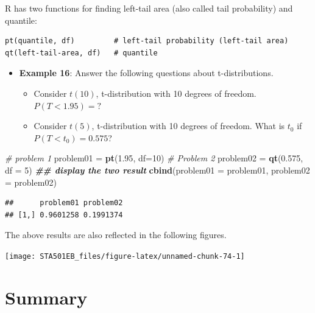 \documentclass[
]{book}
\newenvironment{Shaded}{\begin{snugshade}}{\end{snugshade}}
\newcommand{\AttributeTok}[1]{\textcolor[rgb]{0.13,0.29,0.53}{#1}}
\newcommand{\CommentTok}[1]{\textcolor[rgb]{0.56,0.35,0.01}{\textit{#1}}}
\newcommand{\DecValTok}[1]{\textcolor[rgb]{0.00,0.00,0.81}{#1}}
\newcommand{\DocumentationTok}[1]{\textcolor[rgb]{0.56,0.35,0.01}{\textbf{\textit{#1}}}}
\newcommand{\FloatTok}[1]{\textcolor[rgb]{0.00,0.00,0.81}{#1}}
\newcommand{\FunctionTok}[1]{\textcolor[rgb]{0.13,0.29,0.53}{\textbf{#1}}}
\newcommand{\NormalTok}[1]{#1}
\newcommand{\OtherTok}[1]{\textcolor[rgb]{0.56,0.35,0.01}{#1}}
\providecommand{\tightlist}{%
  \setlength{\itemsep}{0pt}\setlength{\parskip}{0pt}}
\begin{document}
R has two functions for finding left-tail area (also called tail probability) and quantile:

\begin{verbatim}
pt(quantile, df)         # left-tail probability (left-tail area)
qt(left-tail-area, df)   # quantile
\end{verbatim}

\begin{itemize}
\tightlist
\item
  \textbf{Example 16}: Answer the following questions about t-distributions.

  \begin{itemize}
  \tightlist
  \item
    Consider \(t(10)\), t-distribution with 10 degrees of freedom. \(P(T<1.95) = ?\)
  \item
    Consider \(t(5)\), t-distribution with 10 degrees of freedom. What is \(t_0\) if \(P(T<t_0) = 0.575\)?
  \end{itemize}
\end{itemize}

\begin{Shaded}
\begin{Highlighting}[]
\CommentTok{\# problem 1}
\NormalTok{problem01 }\OtherTok{=} \FunctionTok{pt}\NormalTok{(}\FloatTok{1.95}\NormalTok{, }\AttributeTok{df=}\DecValTok{10}\NormalTok{)}
\CommentTok{\# Problem 2}
\NormalTok{problem02 }\OtherTok{=} \FunctionTok{qt}\NormalTok{(}\FloatTok{0.575}\NormalTok{, }\AttributeTok{df =} \DecValTok{5}\NormalTok{)}
\DocumentationTok{\#\# display the two result}
\FunctionTok{cbind}\NormalTok{(}\AttributeTok{problem01 =}\NormalTok{ problem01, }\AttributeTok{problem02 =}\NormalTok{ problem02)}
\end{Highlighting}
\end{Shaded}

\begin{verbatim}
##      problem01 problem02
## [1,] 0.9601258 0.1991374
\end{verbatim}

The above results are also reflected in the following figures.

\begin{center}\texttt{[image: STA501EB\_files/figure-latex/unnamed-chunk-74-1]} \end{center}

\hypertarget{summary}{%
\section{Summary}\label{summary}}
\end{document}
